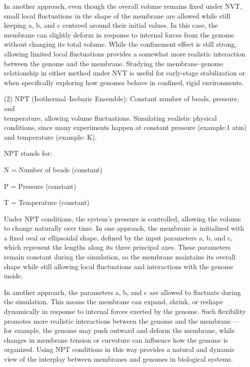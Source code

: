 \documentclass[12pt]{article}
\begin{document}
\begin{flushleft}
In another approach, even though the overall volume remains fixed under NVT, small local fluctuations in the shape of the membrane are allowed while still keeping a, b, and c centered around their initial values. In this case, the membrane can slightly deform in response to internal forces from the genome without changing its total volume. While the confinement effect is still strong, allowing limited local fluctuations provides a somewhat more realistic interaction between the genome and the membrane. Studying the membrane–genome relationship in either method under NVT is useful for early-stage stabilization or when specifically exploring how genomes behave in confined, rigid environments.

   
   
   
   

(2) NPT (Isothermal–Isobaric Ensemble): Constant number of beads, pressure, and \\
  \indent temperature, allowing volume fluctuations. Simulating realistic physical conditions, since 
  \indent many experiments happen at constant pressure (example:1 atm) and temperature  (example: 
   K).

NPT stands for:

  \indent\indent  N = Number of beads (constant)

  \indent\indent  P = Pressure (constant)

  \indent\indent  T = Temperature (constant)
    
    Under NPT conditions, the system’s pressure is controlled, allowing the volume to change naturally over time. In one approach, the membrane is initialized with a fixed oval or ellipsoidal shape, defined by the input parameters a, b, and c, which represent the lengths along its three principal axes. These parameters remain constant during the simulation, so the membrane maintains its overall shape while still allowing local fluctuations and interactions with the genome inside.

In another approach, the parameters a, b, and c are allowed to fluctuate during the simulation. This means the membrane can expand, shrink, or reshape dynamically in response to internal forces exerted by the genome. Such flexibility promotes more realistic interactions between the genome and the membrane — for example, the genome may push outward and deform the membrane, while changes in membrane tension or curvature can influence how the genome is organized. Using NPT conditions in this way provides a natural and dynamic view of the interplay between membranes and genomes in biological systems.
   

\end{flushleft}
\end{document}
